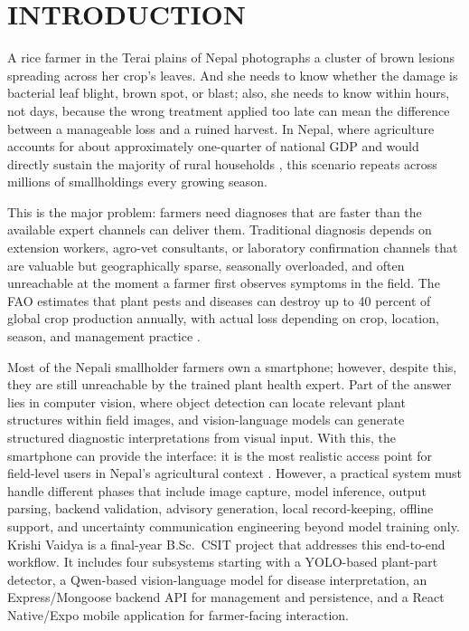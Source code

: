 \chapter{INTRODUCTION}


A rice farmer in the Terai plains of Nepal photographs a cluster of brown lesions spreading across her crop's leaves. And she needs to know whether the damage is bacterial leaf blight, brown spot, or blast; also, she needs to know within hours, not days, because the wrong treatment applied too late can mean the difference between a manageable loss and a ruined harvest. In Nepal, where agriculture accounts for about approximately one-quarter of national GDP and would directly sustain the majority of rural households \parencite{moaldAgricultureStats2080,nsoAgricultureCensus2021}, this scenario repeats across millions of smallholdings every growing season.

This is the major problem: farmers need diagnoses that are faster than the available expert channels can deliver them. Traditional diagnosis depends on extension workers, agro-vet consultants, or laboratory confirmation channels that are valuable but geographically sparse, seasonally overloaded, and often unreachable at the moment a farmer first observes symptoms in the field. The FAO estimates that plant pests and diseases can destroy up to 40 percent of global crop production annually, with actual loss depending on crop, location, season, and management practice \parencite{faoPlantHealthLosses}.

Most of the Nepali smallholder farmers own a smartphone; however, despite this, they are still unreachable by the trained plant health expert\parencite{khatriNepalDigitalAgri2023}.  Part of the answer lies in computer vision, where object detection can locate relevant plant structures within field images, and vision-language models can generate structured diagnostic interpretations from visual input. With this, the smartphone can provide the interface: it is the most realistic access point for field-level users in Nepal's agricultural context \parencite{faoNepalDigitalAgriculture}. However, a practical system must handle different phases that include image capture, model inference, output parsing, backend validation, advisory generation, local record-keeping, offline support, and uncertainty communication engineering beyond model training only.
Krishi Vaidya is a final-year B.Sc.\ CSIT project that addresses this end-to-end workflow. It includes four subsystems starting with a YOLO-based plant-part detector, a Qwen-based vision-language model for disease interpretation, an Express/Mongoose backend API for management and persistence, and a React Native/Expo mobile application for farmer-facing interaction.

